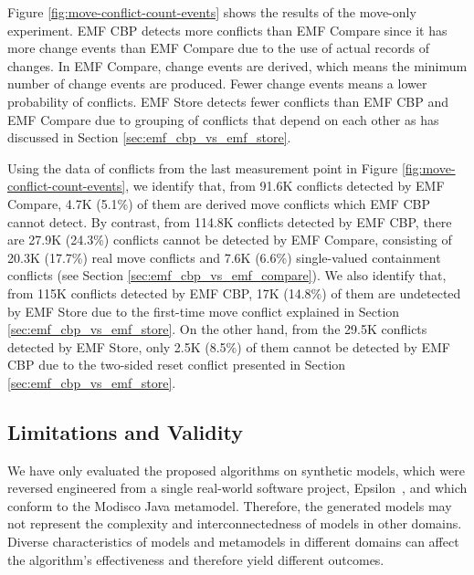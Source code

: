 %
%
%
%
%


Figure \ref{fig:move-conflict-count-events} shows the results of the move-only experiment. EMF CBP detects more conflicts than EMF Compare since it has more change events than EMF Compare due to the use of actual records of changes. In EMF Compare, change events are derived, which means the minimum number of change events are produced. Fewer change events means a lower probability of conflicts. EMF Store detects fewer conflicts than EMF CBP and EMF Compare due to grouping of conflicts that depend on each other as has discussed in Section \ref{sec:emf_cbp_vs_emf_store}.

Using the data of conflicts from the last measurement point in Figure \ref{fig:move-conflict-count-events}, we identify that, from 91.6K conflicts detected by EMF Compare, 4.7K (5.1\%) of them are derived move conflicts which EMF CBP cannot detect. By contrast, from 114.8K conflicts detected by EMF CBP, there are 27.9K (24.3\%) conflicts cannot be detected by EMF Compare, consisting of 20.3K (17.7\%) real move conflicts and 7.6K (6.6\%) single-valued containment conflicts (see Section \ref{sec:emf_cbp_vs_emf_compare}). We also identify that, from 115K conflicts detected by EMF CBP, 17K (14.8\%) of them are undetected by EMF Store due to the first-time move conflict explained in Section \ref{sec:emf_cbp_vs_emf_store}. On the other hand, from the 29.5K conflicts detected by EMF Store, only 2.5K (8.5\%) of them cannot be detected by EMF CBP due to the two-sided reset conflict presented in Section \ref{sec:emf_cbp_vs_emf_store}.

\subsection{Limitations and Validity}
\label{sec:limitation_and_Threat_to_validity}
We have only evaluated the proposed algorithms on synthetic models, which were reversed engineered from a single real-world software project, Epsilon~\cite{eclipse2018epsilongit}, and which conform to the Modisco Java metamodel. Therefore, the generated models may not represent the complexity and interconnectedness of models in other domains. Diverse characteristics of models and metamodels in different domains can affect the algorithm's effectiveness and therefore yield different outcomes.

